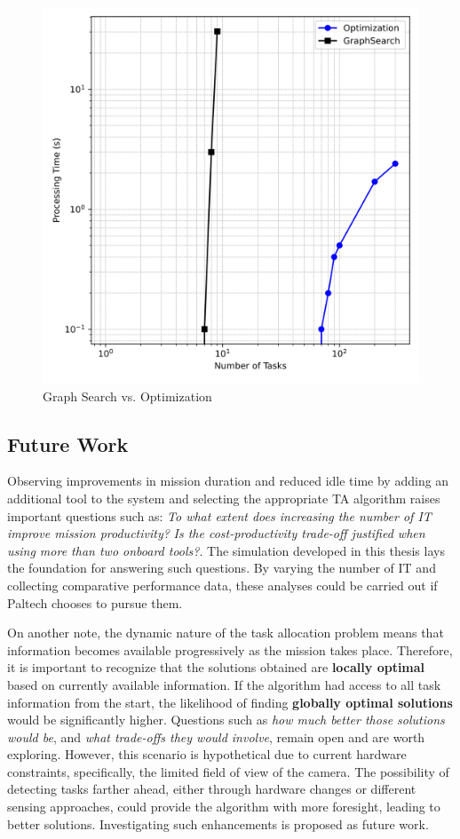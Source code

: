 \begin{figure}[hbt]
    \centering
    \includegraphics[width=0.5\linewidth]{gfx/ch03/mip_vs_gs_procc_time_plot.png}
    \caption{Graph Search vs. Optimization}
    \label{fig:mip-vs-gs-processing-time}
\end{figure}

\subsection{Future Work}
Observing improvements in mission duration and reduced idle time by adding an additional tool to the system and selecting the appropriate \ac{TA} algorithm raises important questions such as: \textit{To what extent does increasing the number of \ac{IT} improve mission productivity?} \textit{Is the cost-productivity trade-off justified when using more than two onboard tools?}. The simulation developed in this thesis lays the foundation for answering such questions. By varying the number of \ac{IT} and collecting comparative performance data, these analyses could be carried out if Paltech chooses to pursue them.

On another note, the dynamic nature of the task allocation problem means that information becomes available progressively as the mission takes place. Therefore, it is important to recognize that the solutions obtained are \textbf{locally optimal} based on currently available information. If the algorithm had access to all task information from the start, the likelihood of finding \textbf{globally optimal solutions} would be significantly higher. Questions such as \textit{how much better those solutions would be}, and \textit{what trade-offs they would involve}, remain open and are worth exploring. However, this scenario is hypothetical due to current hardware constraints, specifically, the limited field of view of the camera. The possibility of detecting tasks farther ahead, either through hardware changes or different sensing approaches, could provide the algorithm with more foresight, leading to better solutions. Investigating such enhancements is proposed as future work.

